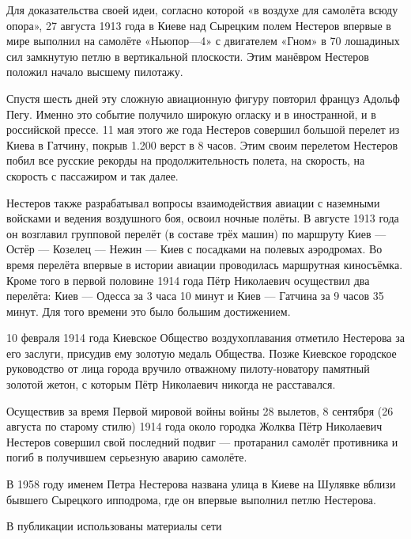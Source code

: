 Для доказательства своей идеи, согласно которой «в воздухе для самолёта всюду
опора», 27 августа 1913 года в Киеве над Сырецким полем  Нестеров впервые в
мире выполнил на самолёте «Ньюпор—4» с двигателем «Гном» в 70 лошадиных сил
замкнутую петлю в вертикальной плоскости. Этим манёвром Нестеров положил начало
высшему пилотажу.

Спустя шесть дней эту сложную авиационную фигуру повторил француз Адольф Пегу.
Именно это событие получило широкую огласку и в иностранной, и в российской
прессе. 11 мая этого же года Нестеров совершил большой перелет из Киева в
Гатчину, покрыв 1.200 верст в 8 часов. Этим  своим  перелетом Нестеров побил
все русские рекорды на продолжительность полета, на скорость, на скорость с
пассажиром и так далее. 

Нестеров также разрабатывал вопросы взаимодействия авиации с наземными войсками
и ведения воздушного боя, освоил ночные полёты. В августе 1913 года он
возглавил групповой перелёт (в составе трёх машин) по маршруту Киев — Остёр —
Козелец — Нежин — Киев с посадками на полевых аэродромах. Во время перелёта
впервые в истории авиации проводилась маршрутная киносъёмка. Кроме того  в
первой половине 1914 года Пётр Николаевич осуществил два перелёта: Киев —
Одесса за 3 часа 10 минут и Киев — Гатчина за 9 часов 35 минут. Для того
времени это было большим достижением.

10 февраля 1914 года Киевское Общество воздухоплавания отметило Нестерова за
его заслуги, присудив ему золотую медаль Общества. Позже Киевское городское
руководство от лица города вручило отважному пилоту-новатору памятный золотой
жетон, с которым Пётр Николаевич никогда не расставался.

Осуществив за время Первой мировой войны войны 28 вылетов, 8 сентября (26
августа по старому стилю) 1914 года около городка Жолква Пётр Николаевич
Нестеров совершил свой последний подвиг — протаранил самолёт противника и погиб
в получившем серьезную аварию самолёте.

В 1958 году именем Петра Нестерова названа улица в Киеве на Шулявке вблизи
бывшего Сырецкого ипподрома, где он впервые выполнил петлю Нестерова.

В публикации использованы материалы сети

